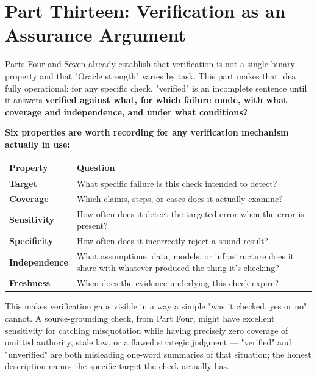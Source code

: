 \section{Part Thirteen: Verification as an Assurance Argument}

Parts Four and Seven already establish that verification is not a single binary property and that "Oracle strength" varies by task. This part makes that idea fully operational: for any specific check, "verified" is an incomplete sentence until it answers \textbf{verified against what, for which failure mode, with what coverage and independence, and under what conditions?}

\textbf{Six properties are worth recording for any verification mechanism actually in use:}

\begin{center}
\begin{tabular}{|p{}|p{}|}
\hline
Property & Question \\
\hline
\textbf{Target} & What specific failure is this check intended to detect? \\
\hline
\textbf{Coverage} & Which claims, steps, or cases does it actually examine? \\
\hline
\textbf{Sensitivity} & How often does it detect the targeted error when the error is present? \\
\hline
\textbf{Specificity} & How often does it incorrectly reject a sound result? \\
\hline
\textbf{Independence} & What assumptions, data, models, or infrastructure does it share with whatever produced the thing it's checking? \\
\hline
\textbf{Freshness} & When does the evidence underlying this check expire? \\
\hline
\end{tabular}
\end{center}

This makes verification gaps visible in a way a simple "was it checked, yes or no" cannot. A source-grounding check, from Part Four, might have excellent sensitivity for catching misquotation while having precisely zero coverage of omitted authority, stale law, or a flawed strategic judgment --- "verified" and "unverified" are both misleading one-word summaries of that situation; the honest description names the specific target the check actually has.

